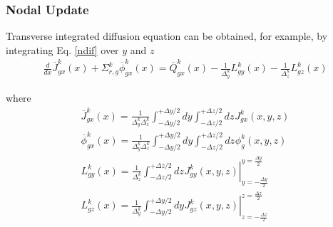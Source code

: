 \documentclass{beamer}
\begin{document}

\begin{frame}
\frametitle{Nodal Update}
\begin{block}{Transverse integrated diffusion equation can be obtained, for example, by integrating Eq. \eqref{ndif} over $y$ and $z$}
    \begin{equation}
      \begin{split}
      \frac{d}{{dx}}\overline J _{gx}^k(x) + \Sigma _{r,g}^k\overline \phi  _{gx}^k(x) = \overline Q _{gx}^k(x) - \frac{1}{{\Delta _y^k}}L_{gy}^k(x) - \frac{1}{{\Delta _z^k}}L_{gz}^k(x) \label{eq:transv}
      \end{split}
    \end{equation}
\end{block}
\begin{block}{where}
    \begin{equation}
      \begin{split}
      \scriptscriptstyle \overline J _{gx}^k(x) = \frac{1}{{\Delta _y^k\Delta _z^k}}\int_{ - \Delta y/2}^{ + \Delta y/2} {dy} \int_{ - \Delta z/2}^{ + \Delta z/2} {dz{^{}}} J_{gx}^k\left( {x,y,z} \right) \\
      \scriptscriptstyle \overline \phi  _{gx}^k(x) = \frac{1}{{\Delta _y^k\Delta _z^k}}\int_{ - \Delta y/2}^{ + \Delta y/2} {dy} \int_{ - \Delta z/2}^{ + \Delta z/2} {dz{^{}}} \phi _g^k\left( {x,y,z} \right) \\
      \scriptscriptstyle L_{gy}^k(x) = \left. {\frac{1}{{\Delta _z^k}}\int_{ - \Delta z/2}^{ + \Delta z/2} {dz{^{}}} J_{gy}^k\left( {x,y,z} \right)} \right|_{y =  - \frac{{\Delta y}}{2}}^{y = \frac{{\Delta y}}{2}} \\
      \scriptscriptstyle L_{gz}^k(x) = \left. {\frac{1}{{\Delta _y^k}}\int_{ - \Delta y/2}^{ + \Delta y/2} {dy{^{}}} J_{gz}^k\left( {x,y,z} \right)} \right|_{z =  - \frac{{\Delta z}}{2}}^{z = \frac{{\Delta z}}{2}} \\
      \end{split}
    \end{equation}
\end{block}
\end{frame}

\end{document}
